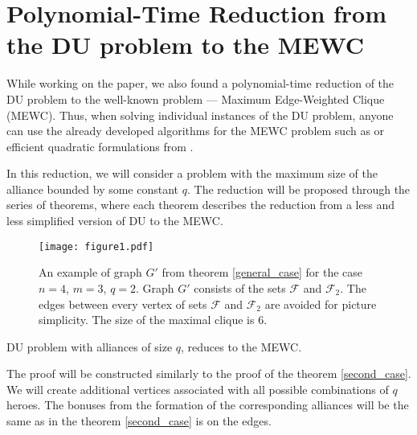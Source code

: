 \documentclass[smallextended]{svjour3}       %
\begin{document}
\section{Polynomial-Time Reduction from the DU problem to the MEWC}
While working on the paper, we also found a polynomial-time reduction of the DU problem to the well-known problem --- Maximum Edge-Weighted Clique (MEWC). Thus, when solving individual instances of the DU problem, anyone can use the already developed algorithms for the MEWC problem such as \cite{san2019new} or efficient quadratic formulations from \cite{hosseinian2017maximum}.

In this reduction, we will consider a problem with the maximum size of the alliance bounded by some constant $q$. The reduction will be proposed through the series of theorems, where each theorem describes the reduction from a less and less simplified version of DU to the MEWC.


\begin{figure}[h!]
\begin{center}
\texttt{[image: figure1.pdf]}
\caption{An example of graph $G'$ from theorem \ref{general_case}  for the case $n=4$, $m=3$, $q=2$.  Graph $G'$ consists of the sets $\mathcal{F}$ and $\mathcal{F}_2$. The edges between every vertex of sets $\mathcal{F}$ and $\mathcal{F}_2$ are avoided for picture simplicity. The size of the maximal clique is 6. }
\label{fig:reduction}
\end{center}
\end{figure}


\begin{theorem}
\label{general_case}
    DU problem with alliances of size $q$, reduces to the MEWC.
\end{theorem}
	The proof will be constructed similarly to the proof of the theorem \ref {second_case}.
We will create additional vertices associated with all possible combinations of $q$ heroes. The bonuses from the formation of the corresponding alliances will be the same as in the theorem \ref {second_case} is on the edges.
\end{document}

